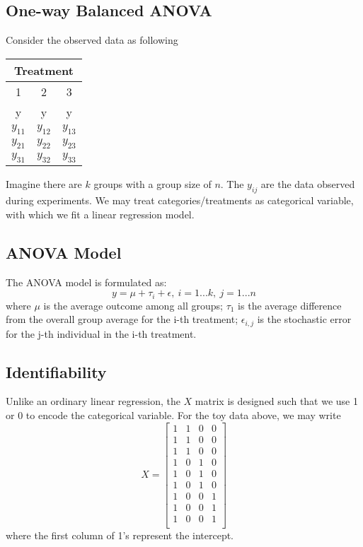\documentclass[9pt]{article}
\begin{document}
\subsection{One-way Balanced ANOVA}
Consider the observed data as following
\begin{center}
\begin{tabular}{ c  c c } 
\hline
\multicolumn{3}{c}{Treatment}\\
 \hline
 \multicolumn{1}{c}{1} & \multicolumn{1}{c}{2} & \multicolumn{1}{c}{3}\\
 y & y & y  \\
 \hline
 $y_{11}$  &  $y_{12}$ &  $y_{13}$ \\
 $y_{21}$  &  $y_{22}$ &  $y_{23}$ \\
 $y_{31}$  &  $y_{32}$ &  $y_{33}$ \\
 \hline
\end{tabular}
\end{center}
Imagine there are $k$ groups with a group size of $n$. The $y_{ij}$ are the data observed during experiments. We may treat categories/treatments as categorical variable, with which we fit a linear regression model.

\subsection{ANOVA Model}
The ANOVA model is formulated as:
$$
y = \mu + \tau_i + \epsilon,\ i=1...k,\ j=1...n
$$
where $\mu$ is the average outcome among all groups; $\tau_1$ is the average difference from the overall group average for the i-th treatment; $\epsilon_{i,j}$ is the stochastic error for the j-th individual in the i-th treatment.

\subsection{Identifiability}
Unlike an ordinary linear regression, the $X$ matrix is designed such that we use 1 or 0 to encode the categorical variable. For the toy data above, we may write
$$
X = \begin{bmatrix}
    1 & 1 & 0 & 0\\
    1 & 1 & 0 & 0\\
    1 & 1 & 0 & 0\\
    1 & 0 & 1 & 0\\
    1 & 0 & 1 & 0\\
    1 & 0 & 1 & 0\\
    1 & 0 & 0 & 1\\
    1 & 0 & 0 & 1\\
    1 & 0 & 0 & 1\\
\end{bmatrix}
$$
where the first column of 1's represent the intercept.\par
\end{document}
